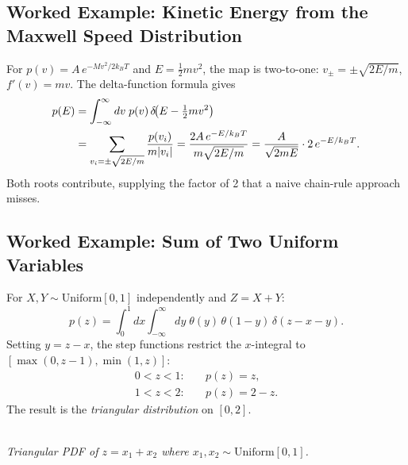 \subsection{Worked Example: Kinetic Energy from the Maxwell Speed Distribution}

\begin{example}
For $p(v) = A\,e^{-Mv^2/2k_BT}$ and $E = \tfrac{1}{2}mv^2$, the map is two-to-one: $v_\pm = \pm\sqrt{2E/m}$, $f'(v) = mv$. The delta-function formula gives
\begin{align}
    p(E) &= \int_{-\infty}^{\infty} dv\; p(v)\,\delta\!\bigl(E - \tfrac{1}{2}mv^2\bigr) \notag \\
         &= \sum_{v_i = \pm\sqrt{2E/m}} \frac{p(v_i)}{m|v_i|}
          = \frac{2A\,e^{-E/k_BT}}{m\sqrt{2E/m}}
          = \frac{A}{\sqrt{2mE}}\cdot 2\,e^{-E/k_BT}.
\end{align}
Both roots contribute, supplying the factor of 2 that a naive chain-rule approach misses.
\end{example}

\subsection{Worked Example: Sum of Two Uniform Variables}

\begin{example}
For $X, Y \sim \mathrm{Uniform}[0,1]$ independently and $Z = X + Y$:
\begin{equation}
    p(z) = \int_0^1 dx\int_{-\infty}^{\infty} dy\;\theta(y)\,\theta(1-y)\,\delta(z-x-y).
\end{equation}
Setting $y = z - x$, the step functions restrict the $x$-integral to $[\max(0,z-1),\min(1,z)]$:
\begin{align}
    0 < z < 1: &\quad p(z) = z, \\
    1 < z < 2: &\quad p(z) = 2-z.
\end{align}
The result is the \emph{triangular distribution} on $[0,2]$.

\begin{center}
\\[3pt]
{\small\itshape Triangular PDF of $z=x_1+x_2$ where $x_1,x_2\sim\mathrm{Uniform}[0,1]$.}
\end{center}
\end{example}

